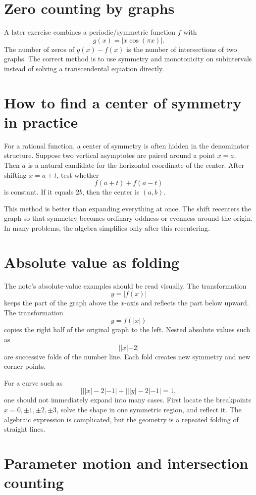 \section{Zero counting by graphs}

A later exercise combines a periodic/symmetric function \(f\) with
\[
  g(x)=|x\cos(\pi x)|.
\]
The number of zeros of \(g(x)-f(x)\) is the number of intersections of two graphs.  The correct method is to use symmetry and monotonicity on subintervals instead of solving a transcendental equation directly.


\section{How to find a center of symmetry in practice}

For a rational function, a center of symmetry is often hidden in the denominator structure.  Suppose two vertical asymptotes are paired around a point \(x=a\).  Then \(a\) is a natural candidate for the horizontal coordinate of the center.  After shifting \(x=a+t\), test whether
\[
  f(a+t)+f(a-t)
\]
is constant.  If it equals \(2b\), then the center is \((a,b)\).

This method is better than expanding everything at once.  The shift recenters the graph so that symmetry becomes ordinary oddness or evenness around the origin.  In many problems, the algebra simplifies only after this recentering.

\section{Absolute value as folding}

The note's absolute-value examples should be read visually.  The transformation
\[
  y=|f(x)|
\]
keeps the part of the graph above the \(x\)-axis and reflects the part below upward.  The transformation
\[
  y=f(|x|)
\]
copies the right half of the original graph to the left.  Nested absolute values such as
\[
  ||x|-2|
\]
are successive folds of the number line.  Each fold creates new symmetry and new corner points.

For a curve such as
\[
  |||x|-2|-1|+|||y|-2|-1|=1,
\]
one should not immediately expand into many cases.  First locate the breakpoints \(x=0,\pm1,\pm2,\pm3\), solve the shape in one symmetric region, and reflect it.  The algebraic expression is complicated, but the geometry is a repeated folding of straight lines.

\section{Parameter motion and intersection counting}


